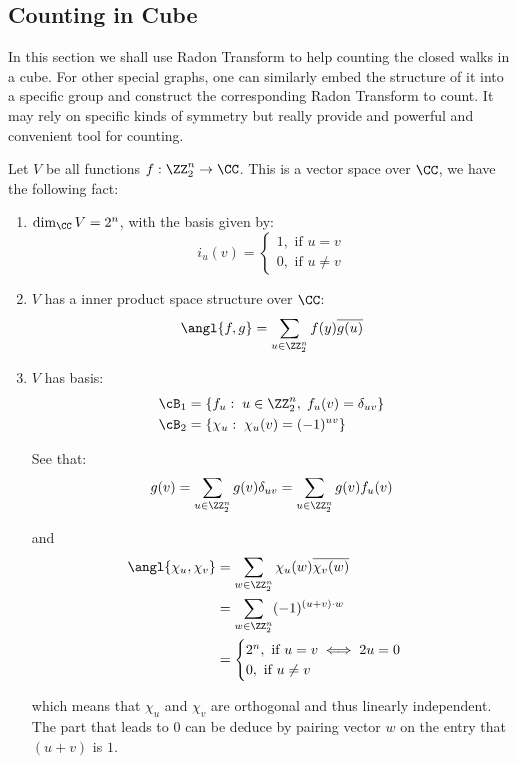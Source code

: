 \subsection{Counting in Cube}

In this section we shall use Radon Transform to help counting the closed walks in a cube. For other special graphs, one can similarly embed the structure of it into a specific group and construct the corresponding Radon Transform to count. It may rely on specific kinds of symmetry but really provide and powerful and convenient tool for counting.

\begin{proposition}
	Let \( V \) be all functions \( f: \ZZ_2^n \to \CC \). This is a vector space over \( \CC \), we have the following fact:
	\begin{enumerate}
		\item \( \dim_\CC V = 2^n \), with the basis given by:
		      \[
			      i_u (v) = \begin{cases}
				      1, \text{ if } u = v \\
				      0, \text{ if } u \ne v
			      \end{cases}
		      \]
		\item \( V \) has a inner product space structure over \( \CC \):
		      \[
			      \angl{f,g} = \sum_{u\in\ZZ_2^n}f(y) \overline{g(u)}
		      \]
		\item \( V \) has basis:
		      \[
			      \begin{aligned}
				      \cB_1 & = \{f_u: \; u\in \ZZ_2^n, \; f_u(v) = \delta_{uv}\} \\
				      \cB_2 & = \{\chi_u: \; \chi_u(v) = (-1)^{uv}\}
			      \end{aligned}
		      \]

		      See that:
		      \[
			      g(v) = \sum_{u\in \ZZ_2^n} g(v)\delta_{uv} = \sum_{u\in \ZZ_2^n} g(v)f_u(v)
		      \]

		      and
		      \begin{equation}
			      \label{eq:eigen}
			      \begin{aligned}
				      \angl{\chi_u, \chi_v} & = \sum_{w\in \ZZ^n_2} \chi_u(w) \overline{\chi_v(w)} \\
				                            & = \sum_{w\in \ZZ^n_2}(-1)^{(u+v)\cdot w}             \\
				                            & = \begin{cases}
					                                2^n, \text{ if } u=v \iff 2u = 0 \\
					                                0, \text{ if } u \ne v
				                                \end{cases}
			      \end{aligned}
		      \end{equation}

		      which means that \( \chi_u \) and \( \chi_v \) are orthogonal and thus linearly independent. The part that leads to \( 0 \) can be deduce by pairing vector \( w \) on the entry that \( (u+v) \) is \( 1 \).
	\end{enumerate}
\end{proposition}


